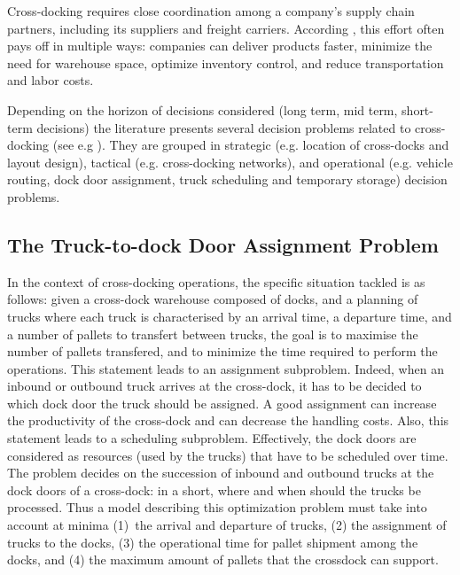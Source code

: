 \documentclass[preprint,12pt,authoryear]{elsarticle}
\begin{document}
Cross-docking requires close coordination among a company’s supply chain partners, including its suppliers and freight carriers. According \citet{DefCrossDock2023}, this effort often pays off in multiple ways: companies can deliver products faster, minimize the need for warehouse space, optimize inventory control, and reduce transportation and labor costs.

Depending on the horizon of decisions considered (long term, mid term, short-term decisions)
the literature presents several decision problems related to cross-docking (see e.g \citet{VANBELLE2012,Nduwayo2020PhD} ). They are grouped in strategic (e.g. location of cross-docks and layout design),  tactical (e.g. cross-docking networks), and operational (e.g. vehicle routing, dock door assignment, truck scheduling and temporary storage) decision problems.

%
%
\subsection{The Truck-to-dock Door Assignment Problem}
\label{sec:TDAP}

In the context of cross-docking operations, the specific situation tackled is as follows: given a cross-dock warehouse composed of docks, and a planning of trucks where each truck is characterised by an arrival time, a departure time, and a number of pallets to transfert between trucks, the goal is to maximise the number of pallets transfered, and to minimize the time required to perform the operations. 
%
This statement leads to an assignment subproblem. Indeed,  when an inbound or outbound truck arrives at the cross-dock, it has to be decided to which dock door the truck should be assigned. A good assignment can increase the productivity of the cross-dock and can decrease the handling costs. 
Also, this statement leads to a scheduling subproblem.  Effectively, the dock doors are considered as resources (used by the trucks) that have to be scheduled over time. The problem decides on the succession of inbound and outbound trucks at the dock doors of a cross-dock: in a short, where and when should the trucks be processed.
%
Thus a model describing this optimization problem must take into account at minima  (1)~the arrival and departure of trucks, (2) the assignment of trucks to the docks, (3) the operational time for pallet shipment among the docks, and (4) the maximum amount of pallets that the crossdock can support.
\medskip
\end{document}
